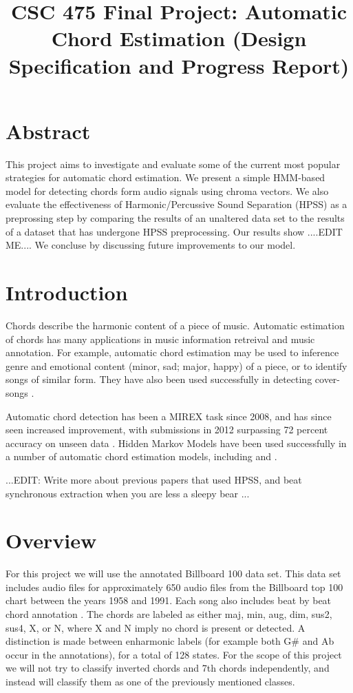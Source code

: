 \documentclass{article}
\title{CSC 475 Final Project: Automatic Chord Estimation (Design Specification and Progress Report)}
\begin{document}
%
\maketitle
%


\section{Abstract}\label{sec:desoutline}
This project aims to investigate and evaluate some of the current most popular
strategies for automatic chord estimation. We present a simple HMM-based model 
for detecting chords form audio signals using chroma vectors. We also evaluate the 
effectiveness of Harmonic/Percussive Sound Separation (HPSS) as a preprossing step by comparing
the results of an unaltered data set to the results of a dataset that has undergone
HPSS preprocessing. Our results show ....EDIT ME.... We concluse by discussing future improvements
to our model.

\section{Introduction}\label{sec:intro}

Chords describe the harmonic content of a piece of music. Automatic estimation of chords
has many applications in music information retreival and music annotation. For example,
automatic chord estimation may be used to inference genre and emotional content 
(minor, sad; major, happy) of a piece, or to identify songs of similar form. 
They have also been used successfully in detecting cover-songs \cite{Papadopoulos:18}.

Automatic chord detection has been a MIREX task since 2008, and has since seen increased
improvement, with submissions in 2012 surpassing 72 percent accuracy on unseen data 
\cite{McVicar:00}. Hidden Markov Models have been used successfully in a number of 
automatic chord estimation models, including \cite{Ueda:01} \cite{Lee:15} \cite{Ueda:19}
and \cite{Papadopoulos:18}.

...EDIT: Write more about previous papers that used HPSS, and beat synchronous extraction
when you are less a sleepy bear ...


\section{Overview}\label{sec:approch}

For this project we will use the annotated Billboard 100 data set. This data
set includes audio files for approximately 650 audio files from the Billboard
top 100 chart between the years 1958 and 1991. Each song also includes beat by
beat chord annotation \cite{Burgoyne:07}. The chords are labeled as either maj,
min, aug, dim, sus2, sus4, X, or N, where X and N imply no chord is present or
detected. A distinction is made between enharmonic labels (for example both
G\# and Ab occur in the annotations), for a total of 128 states. 
For the scope of this project we will not try to classify inverted
chords and 7th chords independently, and instead will classify them as one of
the previously mentioned classes.
\end{document}
